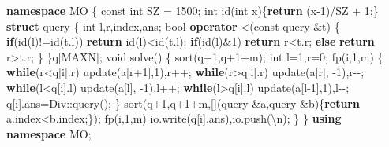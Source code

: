 \documentclass[
]{article}
\newenvironment{Shaded}{}{}
\newcommand{\AttributeTok}[1]{\textcolor[rgb]{0.49,0.56,0.16}{#1}}
\newcommand{\CharTok}[1]{\textcolor[rgb]{0.25,0.44,0.63}{#1}}
\newcommand{\ControlFlowTok}[1]{\textcolor[rgb]{0.00,0.44,0.13}{\textbf{#1}}}
\newcommand{\DataTypeTok}[1]{\textcolor[rgb]{0.56,0.13,0.00}{#1}}
\newcommand{\DecValTok}[1]{\textcolor[rgb]{0.25,0.63,0.44}{#1}}
\newcommand{\KeywordTok}[1]{\textcolor[rgb]{0.00,0.44,0.13}{\textbf{#1}}}
\newcommand{\NormalTok}[1]{#1}
\newcommand{\SpecialCharTok}[1]{\textcolor[rgb]{0.25,0.44,0.63}{#1}}
\begin{document}
\begin{Shaded}
\begin{Highlighting}[]
\KeywordTok{namespace}\NormalTok{ MO}
\NormalTok{\{}
    \AttributeTok{const} \DataTypeTok{int}\NormalTok{ SZ = }\DecValTok{1500}\NormalTok{;}
    \DataTypeTok{int}\NormalTok{ id(}\DataTypeTok{int}\NormalTok{ x)\{}\ControlFlowTok{return}\NormalTok{ (x{-}}\DecValTok{1}\NormalTok{)/SZ + }\DecValTok{1}\NormalTok{;\}}
    \KeywordTok{struct}\NormalTok{ query}
\NormalTok{    \{}
        \DataTypeTok{int}\NormalTok{ l,r,index,ans;}
        \DataTypeTok{bool} \KeywordTok{operator}\NormalTok{ \textless{}(}\AttributeTok{const}\NormalTok{ query \&t)}
\NormalTok{        \{}
            \ControlFlowTok{if}\NormalTok{(id(l)!=id(t.l)) }\ControlFlowTok{return}\NormalTok{ id(l)\textless{}id(t.l);}
            \ControlFlowTok{if}\NormalTok{(id(l)\&}\DecValTok{1}\NormalTok{) }\ControlFlowTok{return}\NormalTok{ r\textless{}t.r;}
            \ControlFlowTok{else} \ControlFlowTok{return}\NormalTok{ r\textgreater{}t.r; }
\NormalTok{        \}}
\NormalTok{    \}q[MAXN];}
    \DataTypeTok{void}\NormalTok{ solve()}
\NormalTok{    \{}
\NormalTok{        sort(q+}\DecValTok{1}\NormalTok{,q+}\DecValTok{1}\NormalTok{+m);}
        \DataTypeTok{int}\NormalTok{ l=}\DecValTok{1}\NormalTok{,r=}\DecValTok{0}\NormalTok{;}
\NormalTok{        fp(i,}\DecValTok{1}\NormalTok{,m)}
\NormalTok{        \{}
            \ControlFlowTok{while}\NormalTok{(r\textless{}q[i].r) update(a[r+}\DecValTok{1}\NormalTok{],}\DecValTok{1}\NormalTok{),r++;}
            \ControlFlowTok{while}\NormalTok{(r\textgreater{}q[i].r) update(a[r], {-}}\DecValTok{1}\NormalTok{),r{-}{-};}
            \ControlFlowTok{while}\NormalTok{(l\textless{}q[i].l) update(a[l], {-}}\DecValTok{1}\NormalTok{),l++;}
            \ControlFlowTok{while}\NormalTok{(l\textgreater{}q[i].l) update(a[l{-}}\DecValTok{1}\NormalTok{],}\DecValTok{1}\NormalTok{),l{-}{-};}
\NormalTok{            q[i].ans=Div::query();}
\NormalTok{        \}}
\NormalTok{        sort(q+}\DecValTok{1}\NormalTok{,q+}\DecValTok{1}\NormalTok{+m,[](query \&a,query \&b)\{}\ControlFlowTok{return}\NormalTok{ a.index\textless{}b.index;\});}
\NormalTok{        fp(i,}\DecValTok{1}\NormalTok{,m) io.write(q[i].ans),io.push(}\CharTok{\textquotesingle{}}\SpecialCharTok{\textbackslash{}n}\CharTok{\textquotesingle{}}\NormalTok{);}
\NormalTok{    \}    }
\NormalTok{\}}
\KeywordTok{using} \KeywordTok{namespace}\NormalTok{ MO;}
\end{Highlighting}
\end{Shaded}
\end{document}
